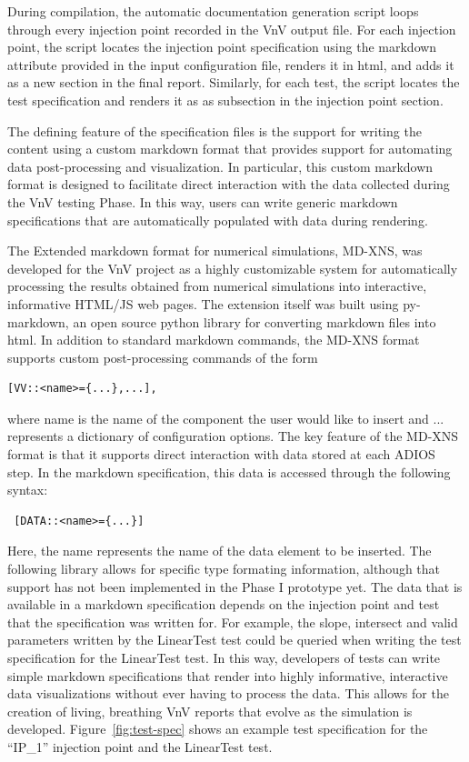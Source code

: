 During compilation, the automatic documentation generation script loops through every injection point recorded in the VnV output file. For each injection point, the script locates the injection point specification using the markdown attribute provided in the input configuration file, renders it in html, and adds it as a new section in the final report. Similarly, for each test, the script locates the test specification and renders it as as subsection in the injection point section. 

The defining feature of the specification files is the support for writing the content using a custom markdown format that provides support for automating data post-processing and visualization. In particular, this custom markdown format is designed to facilitate direct interaction with the data collected during the VnV testing Phase. In this way, users can write generic markdown specifications that are automatically populated with data during rendering.   

The Extended markdown format for numerical simulations, MD-XNS,  was developed for the VnV project as a highly customizable system for automatically processing the results obtained from numerical simulations into interactive, informative HTML/JS web pages. The extension itself was built using py-markdown, an open source python library for converting markdown files into html. In addition to standard markdown commands, the MD-XNS format supports custom post-processing commands of the form 

\begin{verbatim}
[VV::<name>={...},...], 
\end{verbatim}
where name is the name of the component the user would like to insert and {...} represents a dictionary of configuration options. The key feature of the MD-XNS format is that it supports direct interaction with data stored at each ADIOS step. In the markdown specification, this data is accessed through the following syntax: 
\begin{verbatim}
 [DATA::<name>={...}] 
\end{verbatim}
Here, the name represents the name of the data element to be inserted. The following library allows for specific type formating information, although that support has not been implemented in the Phase I prototype yet. The data that is available in a markdown specification depends on the injection point and test that the specification was written for. For example, the slope, intersect and valid parameters written by the LinearTest test could be queried when writing the test specification for the LinearTest test. In this way, developers of tests can write simple markdown specifications that render into highly informative, interactive data visualizations without ever having to process the data. This allows for the creation of living, breathing VnV reports that evolve as the simulation is developed. Figure~\ref{fig:test-spec} shows an example test specification for the ``IP\_1'' injection point and the LinearTest test. 

